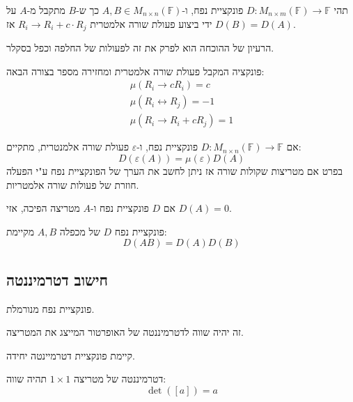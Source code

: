 \documentclass{tstextbook}
\begin{document}
\begin{proposition}
תהי \(D:M_{n\times m}\left( \mathbb{F}  \right)\to \mathbb{F}\) פונקציית נפח, ו-\(A,B \in M_{n\times n}\left( \mathbb{F}  \right)\) כך ש-\(B\) מתקבל מ-\(A\) על ידי ביצוע פעולת שורה אלמטרית \(R_{i}\to R_{i}+c\cdot R_{j}\) אז \(D(B)=D(A)\).

\end{proposition}
הרעיון של ההוכחה הוא לפרק את זה לפעולות של החלפה וכפל בסקלר.

\begin{definition}
פונקציה המקבל פעולת שורה אלמטרית ומחזירה מספר בצורה הבאה:
$$\begin{gather}\mu\left( R_{i}\to cR_{i} \right)=c  \\\mu\left( R_{i}\leftrightarrow  R_{j}  \right) = -1 \\\mu\left( R_{i}\to R_{i}+cR_{j} \right)=1
\end{gather}$$

\end{definition}
\begin{corollary}
אם \(D:M_{n\times n}\left( \mathbb{F}  \right)\to \mathbb{F}\) פונקציית נפח, ו-\(\varepsilon\) פעולת שורה אלמנטרית, מתקיים:
$$D\left( \varepsilon(A) \right)=\mu\left( \varepsilon \right)D(A)$$
בפרט אם מטריצות שקולות שורה אז ניתן לחשב את הערך של הפונקציית נפח ע"י הפעלה חוזרת של פעולות שורה אלמטריות.

\end{corollary}
\begin{proposition}
אם \(D\) פונקציית נפח ו-\(A\) מטריצה הפיכה, אזי \(D(A)=0\).

\end{proposition}
\begin{proposition}
פונקציית נפח \(D\) של מכפלה \(A,B\) מקיימת:
$$D(AB)=D(A) D (B)$$

\end{proposition}
\subsection{חישוב דטרמיננטה}

\begin{definition}[דטרמיננטה]
פונקציית נפח מנורמלת.

\end{definition}
\begin{definition}
זה יהיה שווה לדטרמיננטה של האופרטור המייצג את המטריצה.

\end{definition}
\begin{proposition}
קיימת פונקציית דטרמיינטה יחידה.

\end{proposition}
\begin{proposition}
דטרמיננטה של מטריצה \(1\times 1\) תהיה שווה:
$$\det([a])=a$$

\end{proposition}
\end{document}
